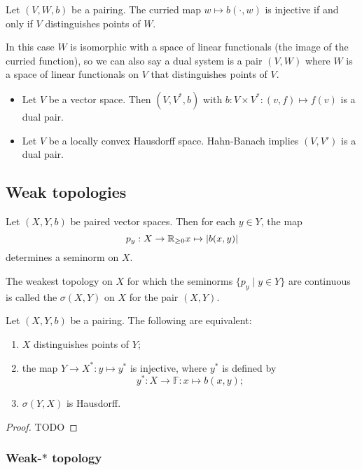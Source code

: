 \begin{lemma}
Let $(V,W, b)$ be a pairing. The curried map $w\mapsto b(\cdot, w)$ is injective \textup{if and only if} $V$ distinguishes points of $W$.
\end{lemma}
In this case $W$ is isomorphic with a space of linear functionals (the image of the curried function), so we can also say a dual system is a pair $(V,W)$ where $W$ is a space of linear functionals on $V$ that distinguishes points of $V$.

\begin{example}
\begin{itemize}
\item Let $V$ be a vector space. Then $(V,V^*, b)$ with $b:V\times V^*: (v,f)\mapsto f(v)$ is a dual pair.
\item Let $V$ be a locally convex Hausdorff space. Hahn-Banach implies $(V,V')$ is a dual pair.
\end{itemize}
\end{example}

\subsection{Weak topologies}
\begin{definition}
Let $(X,Y,b)$ be paired vector spaces. Then for each $y\in Y$, the map
\[ p_y: X\to \mathbb{R}_{\geq 0} x\mapsto |b(x,y)| \]
determines a seminorm on $X$.

The weakest topology on $X$ for which the seminorms $\{p_y\;|\;y\in Y\}$ are continuous is called the  $\sigma(X,Y)$ on $X$ for the pair $(X,Y)$.
\end{definition}

\begin{proposition}
Let $(X,Y,b)$ be a pairing. The following are equivalent:
\begin{enumerate}
\item $X$ distinguishes points of $Y$;
\item the map $Y\to X^*: y\mapsto y^*$ is injective, where $y^*$ is defined by
\[ y^*: X\to \mathbb{F}: x\mapsto b(x,y); \]
\item $\sigma(Y,X)$ is Hausdorff.
\end{enumerate}
\end{proposition}
\begin{proof}
TODO
\end{proof}

\subsubsection{Weak-$*$ topology}

